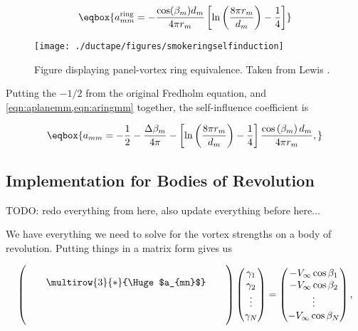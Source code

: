 \begin{equation}
	\label{eqn:aringmm}
	\eqbox{
	a^\text{ring}_{mm} = - \frac{\cos(\beta_m)d_m}{4 \pi r_m} \left[ \ln \left(\frac{8 \pi r_m}{d_m}\right) - \frac{1}{4}\right]
}
\end{equation}

\begin{figure}[h!]
	\centering
	\texttt{[image: ./ductape/figures/smokeringselfinduction]}
	\caption{Figure displaying panel-vortex ring equivalence. Taken from Lewis \cite{Lewis_1991}.}
	\label{fig:smokeringselfinduction}
\end{figure}



Putting the \(-1/2\) from the original Fredholm equation, and \cref{eqn:aplanemm,eqn:aringmm} together, the self-influence coefficient is

\begin{equation}
	\eqbox{
		a_{mm} = -\frac{1}{2}
		- \frac{\Delta \beta_m}{4 \pi}
		- \left[ \ln \left(\frac{8 \pi r_m}{d_m}\right) - \frac{1}{4} \right] \frac{\cos\left(\beta_m\right)d_m}{4\pi r_m} ,
	}
\end{equation}


\subsection{Implementation for Bodies of Revolution}

TODO: redo everything from here, also update everything before here...

We have everything we need to solve for the vortex strengths on a body of revolution.
Putting things in a matrix form gives us

\begin{equation}
	\label{eqn:axisym_linear_system}
	\begin{pmatrix}
		& & & &  \\
		& & \multirow{3}{*}{\Huge $a_{mn}$}  & &  \\
		& & & &  \\
		& & & &  \\
		& & & &
	\end{pmatrix}
	\begin{pmatrix}
		\gamma_1 \\
		\gamma_2 \\
		\vdots \\
		\gamma_N
	\end{pmatrix}
	=
	\begin{pmatrix}
		-V_\infty\cos \beta_1 \\
		-V_\infty\cos \beta_2 \\
		\vdots \\
		-V_\infty\cos \beta_N \\
	\end{pmatrix},
\end{equation}

